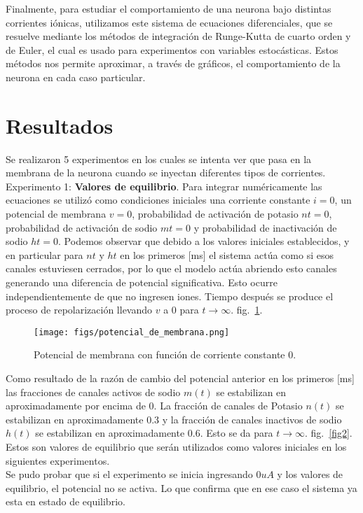 \documentclass[aps,prl,twocolumn,groupedaddress]{revtex4-2}
\begin{document}
Finalmente, para estudiar el comportamiento de una neurona bajo distintas corrientes iónicas, utilizamos este sistema de ecuaciones diferenciales, que se resuelve mediante los métodos de integración de Runge-Kutta de cuarto orden 
y de Euler, el cual es usado para experimentos con variables estocásticas.  Estos métodos nos permite aproximar, a través de gráficos, el comportamiento de la neurona en cada caso particular.



\section{Resultados}
Se realizaron 5 experimentos en los cuales se intenta ver que pasa en la membrana de la neurona cuando se inyectan diferentes tipos de corrientes.\\



Experimento 1: \textbf{Valores de equilibrio}. Para integrar numéricamente las ecuaciones se utilizó como condiciones iniciales una corriente constante $i=0$, un potencial de membrana $v=0$, probabilidad de activación de potasio $nt=0$, probabilidad de activación de sodio $mt=0$ y probabilidad de inactivación de sodio $ht =0$. Podemos observar que debido a los valores iniciales establecidos, y en particular para $nt$ y $ht$ en los primeros [ms] el sistema actúa como si esos canales estuviesen cerrados, por lo que el modelo actúa abriendo esto canales generando una diferencia de potencial significativa.
Esto ocurre independientemente de que no ingresen iones.
Tiempo después se produce el proceso de repolarización llevando $v$ a 0 para  ${t \to \infty}$. fig.~\ref{fig1}.\\

\begin{figure}[h!]
\centering
\texttt{[image: figs/potencial\_de\_membrana.png]}
\caption{Potencial de membrana con función de corriente constante 0. \label{fig1}}
\end{figure}


Como resultado de la razón de cambio del potencial anterior en los primeros [ms] las fracciones de canales activos de sodio $m(t)$ se estabilizan en aproximadamente por encima de 0. La fracción de canales de Potasio $n(t)$ se estabilizan en aproximadamente 0.3 y la fracción de canales inactivos de sodio $h(t)$ se estabilizan en aproximadamente 0.6. Esto se da para ${t \to \infty}$. fig.~\ref{fig2}. Estos son valores de equilibrio que serán utilizados como valores iniciales en los siguientes experimentos.\\
Se pudo probar que si el experimento se inicia ingresando $0uA$ y los valores de equilibrio, el potencial no se activa. Lo que confirma que en ese caso el sistema ya esta en estado de equilibrio. 
\end{document}
